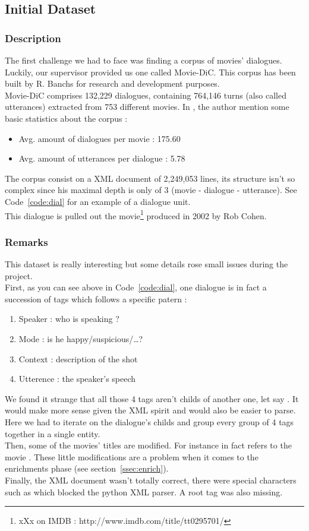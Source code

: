 \subsection{Initial Dataset}
\subsubsection{Description}
The first challenge we had to face was finding a corpus of movies' dialogues. Luckily, our supervisor provided us one called Movie-DiC. This corpus has been built by R. Banchs \cite{banchs} for research and development purposes.\\
Movie-DiC comprises 132,229 dialogues, containing 764,146 turns (also called utterances) extracted from 753 different movies. In \cite{banchs}, the author mention some basic statistics about the corpus :
\begin{itemize}
\item Avg. amount of dialogues per movie : 175.60
\item Avg. amount of utterances per dialogue : 5.78
\end{itemize}
The corpus consist on a XML document of 2,249,053 lines, its structure isn't so complex since his maximal depth is only of 3 (movie - dialogue - utterance). See Code~\ref{code:dial} for an example of a dialogue unit.\\

This dialogue is pulled out the  movie\footnote{xXx on IMDB : http://www.imdb.com/title/tt0295701/} produced in 2002 by Rob Cohen.
\subsubsection{Remarks}
This dataset is really interesting but some details rose small issues during the project.\\
First, as you can see above in Code~\ref{code:dial}, one dialogue is in fact a succession of tags which follows a specific patern :
\begin{enumerate}
\item Speaker : who is speaking ?
\item Mode : is he happy/suspicious/\dots ?
\item Context : description of the shot
\item Utterence : the speaker's speech
\end{enumerate}
We found it strange that all those 4 tags aren't childs of another one, let say . It would make more sense given the XML spirit and would also be easier to parse. Here we had to iterate on the dialogue's childs and group every group of 4 tags together in a single entity.\\
Then, some of the movies' titles are modified. For instance  in fact refers to the movie . These little modifications are a problem when it comes to the enrichments phase (see section~\ref{ssec:enrich}). \\
Finally, the XML document wasn't totally correct, there were special characters such as \say{\&} which blocked the python XML parser. A root tag was also missing.
